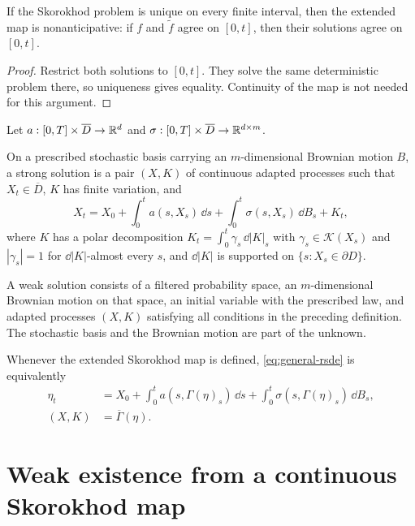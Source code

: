 \begin{proposition}[Nonanticipativity]
If the Skorokhod problem is unique on every finite interval, then the extended
map is nonanticipative: if $f$ and $\widetilde f$ agree on $[0,t]$, then their
solutions agree on $[0,t]$.
\end{proposition}

\begin{proof}
Restrict both solutions to $[0,t]$. They solve the same deterministic problem
there, so uniqueness gives equality. Continuity of the map is not needed for
this argument.
\end{proof}

Let $a:[0,T]\times\overline D\to\mathbb R^d$ and
$\sigma:[0,T]\times\overline D\to\mathbb R^{d\times m}$.

\begin{definition}
On a prescribed stochastic basis carrying an $m$-dimensional Brownian motion
$B$, a strong solution is a pair $(X,K)$ of continuous adapted processes such
that $X_t\in\overline D$, $K$ has finite variation, and
\begin{equation}
  X_t=X_0+\int_0^t a(s,X_s)\,\dd s
      +\int_0^t\sigma(s,X_s)\,\dd B_s+K_t, \label{eq:general-rsde}
\end{equation}
where $K$ has a polar decomposition
$K_t=\int_0^t\gamma_s\,\dd|K|_s$ with
$\gamma_s\in\mathcal K(X_s)$ and $|\gamma_s|=1$ for $\dd|K|$-almost every $s$, and
$\dd|K|$ is supported on $\{s:X_s\in\partial D\}$.
\end{definition}

\begin{definition}
A weak solution consists of a filtered probability space, an
$m$-dimensional Brownian motion on that space, an initial variable with the
prescribed law, and adapted processes $(X,K)$ satisfying all conditions in
the preceding definition. The stochastic basis and the Brownian motion are
part of the unknown.
\end{definition}

Whenever the extended Skorokhod map is defined,
\eqref{eq:general-rsde} is equivalently
\begin{align*}
  \eta_t
    &=X_0+\int_0^t a(s,\Gamma(\eta)_s)\,\dd s
      +\int_0^t\sigma(s,\Gamma(\eta)_s)\,\dd B_s,\\
  (X,K)&=\overline\Gamma(\eta).
\end{align*}

\section{Weak existence from a continuous Skorokhod map}

